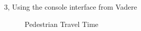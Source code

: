 \begin{task}{3, Using the console interface from Vadere}
\begin{figure}[H]
\caption{Pedestrian Travel Time}
\end{figure}

\end{task}